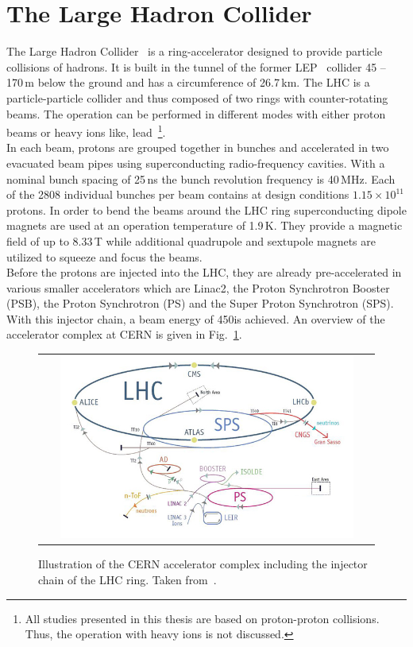 \section{The Large Hadron Collider}
\label{sec:lhc}
The Large Hadron Collider~\cite{Bruning:782076, 1748-0221-3-08-S08001} is a ring-accelerator designed to provide particle collisions of hadrons. It is built in the tunnel of the former LEP~\cite{LEPdesign} collider 45 -- 170\,m below the ground and has a circumference of 26.7\,km. The LHC is a particle-particle collider and thus composed of two rings with counter-rotating beams. The operation can be performed in different modes with either proton beams or heavy ions like, \eg lead~\footnote{All studies presented in this thesis are based on proton-proton collisions. Thus, the operation with heavy ions is not discussed.}. \\
In each beam, protons are grouped together in bunches and accelerated in two evacuated beam pipes using superconducting radio-frequency cavities. With a nominal bunch spacing of 25\,ns the bunch revolution frequency is 40\,MHz. Each of the 2808 individual bunches per beam contains at design conditions $1.15 \times 10^{11}$ protons. In order to bend the beams around the LHC ring superconducting dipole magnets are used at an operation temperature of 1.9\,K. They provide a magnetic field of up to 8.33\,T while additional quadrupole and sextupole magnets are utilized to squeeze and focus the beams.\\  
Before the protons are injected into the LHC, they are already pre-accelerated in various smaller accelerators which are Linac2, the Proton Synchrotron Booster (PSB), the Proton Synchrotron (PS) and the Super Proton Synchrotron (SPS). With this injector chain, a beam energy of 450\gev is achieved. An overview of the accelerator complex at CERN is given in Fig.~\ref{fig:AccComplex}. \\
\begin{figure}[!tp]
  \centering
  \begin{tabular}{c}
    \includegraphics[width=0.9\textwidth]{figures/lhc.jpg}
  \end{tabular}
  \caption{Illustration of the CERN accelerator complex including the injector chain of the LHC ring. Taken from~\cite{CERNaccelerators}.}
  \label{fig:AccComplex}
\end{figure}
